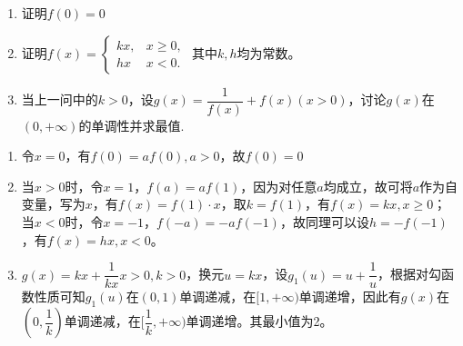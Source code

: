 \begin{enumerate}
    \begin{enumerate}
    \item 证明$f(0) = 0$
    \item 证明$f(x) = \left\{  
         \begin{array}{ll}  
            kx, & x \geq 0, \\  
            hx & x < 0.
         \end{array}
    \right.$ 其中$k, h$均为常数。
    \item 当上一问中的$k > 0$，设$g(x) = \dfrac{1}{f(x)} + f(x) (x > 0)$，讨论$g(x)$在$(0, +\infty)$的单调性并求最值. 
    \end{enumerate}    
    \begin{jieda}
        \begin{enumerate}
        \item 令$x = 0$，有$f(0) = a f(0), a > 0$，故$f(0) = 0$
        \item 当$x > 0$时，令$x = 1$，$f(a) = af(1)$，因为对任意$a$均成立，故可将$a$作为自变量，写为$x$，有$f(x) = f(1) \cdot x$，取$k = f(1)$，有$f(x) = kx, x \geq 0$；当$x < 0$时，令$x = -1$，$f(-a) = -af(-1)$，故同理可以设$h = -f(-1)$，有$f(x) = hx, x < 0$。
        \item $g(x) = kx + \dfrac{1}{kx} x > 0, k > 0$，换元$u = kx$，设$g_1(u) = u+\dfrac{1}{u}$，根据对勾函数性质可知$g_1(u)$在$(0, 1)$单调递减，在$[1, +\infty)$单调递增，因此有$g(x)$在$(0, \dfrac{1}{k})$单调递减，在$[\dfrac{1}{k}, +\infty)$单调递增。其最小值为2。
\end{enumerate}
    \end{jieda}
\end{enumerate}